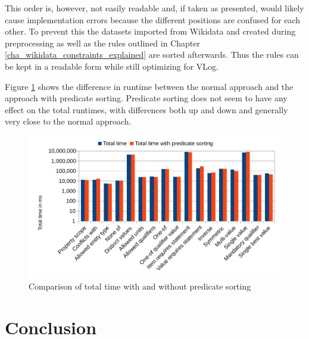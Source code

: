 \documentclass[hyperref,bachelorofscience,fleqn]{cgvpub}
\begin{document}
This order is, however, not easily readable and, if taken as presented, would likely cause implementation errors because the different positions are confused for each other. To prevent this the datasets imported from Wikidata and created during preprocessing as well as the rules outlined in Chapter \ref{cha_wikidata_constraints_explained} are sorted afterwards. Thus the rules can be kept in a readable form while still optimizing for VLog.

Figure \ref{fig_ps_comparision} shows the difference in runtime between the normal approach and the approach with predicate sorting. Predicate sorting does not seem to have any effect on the total runtimes, with differences both up and down and generally very close to the normal approach.

\begin{figure}
\includegraphics[width=\linewidth]{images/PredicateSortingComparison.pdf}
\caption{Comparison of total time with and without predicate sorting}\label{fig_ps_comparision}
\end{figure}

\chapter{Conclusion}
\end{document}
